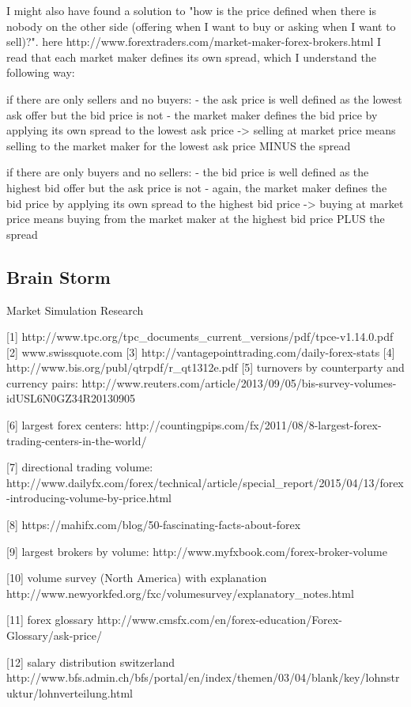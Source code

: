 I might also have found a solution to "how is the price defined when there is nobody on the other side (offering when I want to buy or asking when I want to sell)?".
here http://www.forextraders.com/market-maker-forex-brokers.html I read that each market maker defines its own spread, which I understand the following way:

if there are only sellers and no buyers:
-  the ask price is well defined as the lowest ask offer but the bid price is not
- the market maker defines the bid price by applying its own spread to the lowest ask price
-> selling at market price means selling to the market maker for the lowest ask price MINUS the spread

if there are only buyers and no sellers:
- the bid price is well defined as the highest bid offer but the ask price is not
- again, the market maker defines the bid price by applying its own spread to the highest bid price
-> buying at market price means buying from the market maker at the highest bid price PLUS the spread

\subsection{Brain Storm}

Market Simulation Research

[1] http://www.tpc.org/tpc_documents_current_versions/pdf/tpce-v1.14.0.pdf
[2] www.swissquote.com
[3] http://vantagepointtrading.com/daily-forex-stats
[4] http://www.bis.org/publ/qtrpdf/r_qt1312e.pdf
[5] turnovers by counterparty and currency pairs:
http://www.reuters.com/article/2013/09/05/bis-survey-volumes-idUSL6N0GZ34R20130905

[6] largest forex centers:
http://countingpips.com/fx/2011/08/8-largest-forex-trading-centers-in-the-world/

[7] directional trading volume:
http://www.dailyfx.com/forex/technical/article/special_report/2015/04/13/forex-introducing-volume-by-price.html

[8] https://mahifx.com/blog/50-fascinating-facts-about-forex

[9] largest brokers by volume:
http://www.myfxbook.com/forex-broker-volume

[10] volume survey (North America) with explanation
http://www.newyorkfed.org/fxc/volumesurvey/explanatory_notes.html

[11] forex glossary
http://www.cmsfx.com/en/forex-education/Forex-Glossary/ask-price/

[12] salary distribution switzerland
http://www.bfs.admin.ch/bfs/portal/en/index/themen/03/04/blank/key/lohnstruktur/lohnverteilung.html

